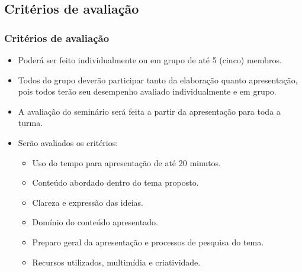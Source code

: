 \subsection[Critérios de avaliação]{Critérios de avaliação}\label{subsec:seminarios-criterios}



\begin{frame}[t]\frametitle{Critérios de avaliação}

  \begin{itemize}
    \justifying{}
    \setlength\itemsep{1em}
    \item Poderá ser feito individualmente ou em grupo de até 5 (cinco) membros.
    \item Todos do grupo deverão participar tanto da elaboração quanto apresentação, pois todos terão seu desempenho avaliado individualmente e em grupo.
    \item A avaliação do seminário será feita a partir da apresentação para toda a turma.
    \item Serão avaliados os critérios:
    \begin{itemize}
      \justifying{}
      \item Uso do tempo para apresentação de até 20 minutos.
      \item Conteúdo abordado dentro do tema proposto.
      \item Clareza e expressão das ideias.
      \item Domínio do conteúdo apresentado.
      \item Preparo geral da apresentação e processos de pesquisa do tema.
      \item Recursos utilizados, multimídia e criatividade.
    \end{itemize}
  \end{itemize}

\end{frame}



